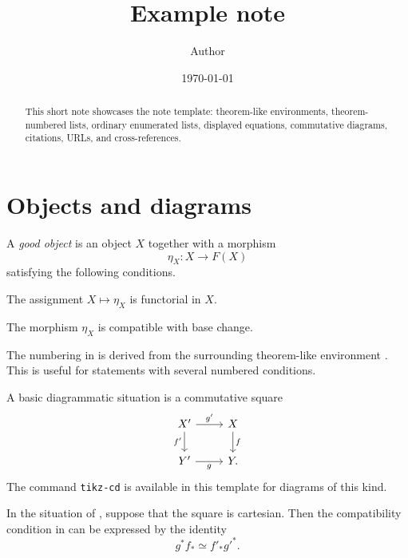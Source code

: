 \documentclass[12pt,a4paper]{amsart}
\title[Example note]{Example note}
\author[Author]{Author}
\date{\today}
\begin{document}
\maketitle

\begin{abstract}
This short note showcases the note template: theorem-like environments,
theorem-numbered lists, ordinary enumerated lists, displayed equations,
commutative diagrams, citations, URLs, and cross-references.
\end{abstract}

\section{Objects and diagrams}

\begin{definition}\label{definition:good-object}
A \emph{good object} is an object \(X\) together with a morphism
\[
  \eta_X \colon X \to F(X)
\]
satisfying the following conditions.
\begin{theoremitems}
  \item \label{item:good-functoriality} The assignment \(X \mapsto \eta_X\)
  is functorial in \(X\).
  \item \label{item:good-compatibility} The morphism \(\eta_X\) is compatible
  with base change.
\end{theoremitems}
\end{definition}

The numbering in  is
derived from the surrounding theorem-like environment
. This is useful for statements with several
numbered conditions.

\begin{example}\label{example:diagram}
A basic diagrammatic situation is a commutative square
\[
\begin{tikzcd}
  X' \arrow[r, "g'"] \arrow[d, "f'"'] & X \arrow[d, "f"] \\
  Y' \arrow[r, "g"']                  & Y .
\end{tikzcd}
\]
The command \texttt{tikz-cd} is available in this template for diagrams of this
kind.
\end{example}

\begin{lemma}\label{lemma:base-change}
In the situation of , suppose that the square is
cartesian. Then the compatibility condition in
 can be expressed by the identity
\[
  g^* f_* \simeq f'_* {g'}^* .
\]
\end{lemma}
\end{document}
